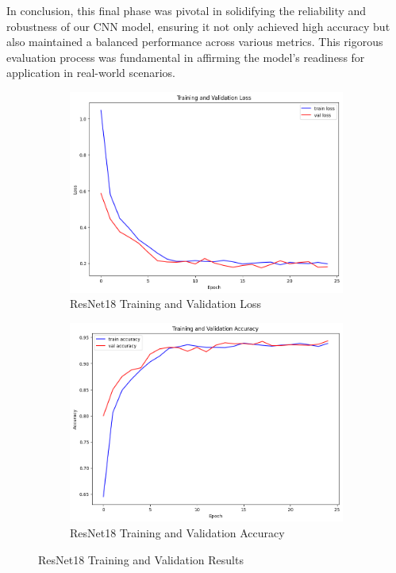 \documentclass{article}
\begin{document}
In conclusion, this final phase was pivotal in solidifying the reliability and robustness of our CNN model, ensuring it not only achieved high accuracy but also maintained a balanced performance across various metrics. This rigorous evaluation process was fundamental in affirming the model's readiness for application in real-world scenarios.
\begin{figure}[h]
    \centering

    \begin{subfigure}{0.5\linewidth}
        \includegraphics[width=\linewidth]{images/resnet18_loss.png}
        \caption{ResNet18 Training and Validation Loss}
        \label{fig:train_acc}
    \end{subfigure}%
    \begin{subfigure}{0.5\linewidth}
        \includegraphics[width=\linewidth]{images/resnet18_accuracy.png}
        \caption{ResNet18 Training and Validation Accuracy}
        \label{fig:val_acc}
    \end{subfigure}

    \caption{ResNet18 Training and Validation Results}
    \label{fig:resnet_results}
\end{figure}
\end{document}

